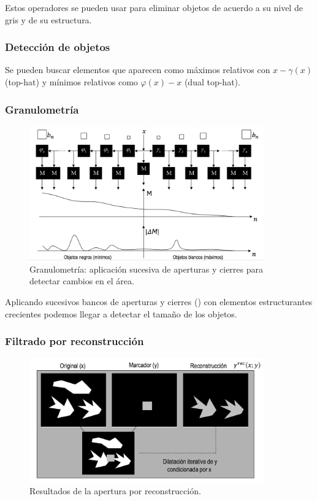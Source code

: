 \documentclass[nochap,palatino]{apuntes}
\begin{document}
Estos operadores se pueden usar para eliminar objetos de acuerdo a su nivel de gris y de su estructura.

\subsubsection{Detección de objetos}

Se pueden buscar elementos que aparecen como máximos relativos con $x - γ(x)$  (top-hat) y mínimos relativos como $φ(x) - x$ (dual top-hat).

\subsubsection{Granulometría}

\begin{figure}[hbtp]
\centering
\includegraphics[width=0.9\textwidth]{img/Granulometria.png}
\caption{Granulometría: aplicación sucesiva de aperturas y cierres para detectar cambios en el área.}
\label{fig:Granulometria}
\end{figure}

Aplicando sucesivos bancos de aperturas y cierres () con elementos estructurantes crecientes podemos llegar a detectar el tamaño de los objetos.

\subsubsection{Filtrado por reconstrucción}

\begin{figure}[hbtp]
\centering
\includegraphics[width=0.9\textwidth]{img/AperturaReconstruccion.png}
\caption{Resultados de la apertura por reconstrucción.}
\label{fig:AperturaReconstruccion}
\end{figure}
\end{document}
